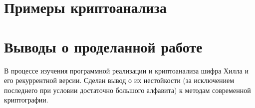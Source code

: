 \documentclass[a4paper]{article}
\begin{document}
\section{Примеры криптоанализа}

\section{Выводы о проделанной работе}
В процессе изучения программной реализации и криптоанализа шифра Хилла и его рекуррентной версии. Сделан вывод о их нестойкости (за исключением последнего при условии достаточно большого алфавита) к методам современной криптографии.
\end{document}
